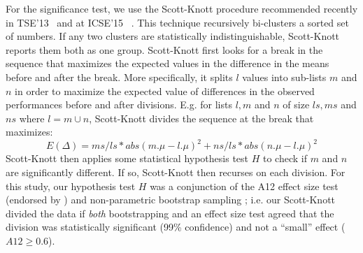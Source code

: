 \documentclass[10pt,conference]{IEEEtran}
\theoremstyle{break}
\theoremstyle{break}
\begin{document}
For the significance test,  we use the 
     Scott-Knott procedure  recommended  recently in TSE'13~\cite{mittas13} and at ICSE'15~\cite{ghotra2015revisiting} . This
     technique recursively bi-clusters a sorted
    set of numbers. If any two clusters are statistically indistinguishable, Scott-Knott
    reports them both as one group.
    Scott-Knott first looks for a break in the sequence that maximizes the expected
    values in the difference in the means before and after the break.
    More specifically,  it  splits $l$ values into sub-lists $m$ and $n$ in order to maximize the expected value of differences  in the observed performances before and after divisions. E.g. for lists $l,m$ and $n$ of size $ls,ms$ and $ns$ where $l=m\cup n$, Scott-Knott divides the sequence at the break that maximizes:
     \[E(\Delta)=ms/ls*abs(m.\mu - l.\mu)^2 + ns/ls*abs(n.\mu - l.\mu)^2\]
Scott-Knott then applies some statistical hypothesis test $H$ to check if $m$ and $n$ are significantly different. If so, Scott-Knott then recurses on each division.
    For this study, our hypothesis test $H$ was a conjunction of the A12 effect size test (endorsed by
    \cite{arcuri11})  and non-parametric bootstrap sampling \cite{efron94}; i.e. our Scott-Knott divided the data if {\em both}
    bootstrapping and an effect size test agreed that the division was statistically significant (99\% confidence) and not a ``small'' effect ($A12 \ge 0.6$).




\end{document}
